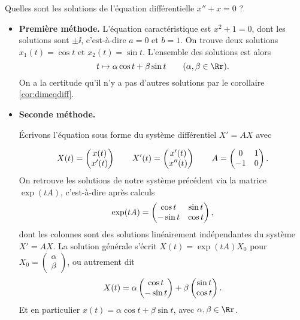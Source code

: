 \documentclass[12pt, class=report,crop=false]{standalone}
\begin{document}
\begin{exemple}
Quelles sont les solutions de l'équation différentielle $x''+x=0$ ?


\begin{itemize}
  \item \textbf{Première méthode.}
  L'équation caractéristique est $x^2+1=0$, dont les solutions sont $\pm\ii$, c'est-à-dire 
  $a=0$ et $b=1$. On trouve deux solutions $x_1(t) = \cos t$ et $x_2(t)=\sin t$. L'ensemble des solutions
  est alors   
  $$t \mapsto \alpha \cos t + \beta \sin t \qquad (\alpha,\beta \in \Rr).$$
  On a la certitude qu'il n'y a pas d'autres solutions par le corollaire \ref{cor:dimeqdiff}.
  
  
  \item \textbf{Seconde méthode.} 

  \'Ecrivons l'équation sous forme du système différentiel $X' = AX$ avec
  
$$
X(t) = \begin{pmatrix}x(t)\cr x'(t)\end{pmatrix}\qquad 
X'(t) = \begin{pmatrix}x'(t)\cr x''(t)\end{pmatrix}\qquad
A = \begin{pmatrix}0&1\cr-1&0\end{pmatrix}.
$$
On retrouve les solutions de notre système précédent via la matrice $\exp (tA)$, c'est-à-dire après calculs 
$$\exp (tA) = \begin{pmatrix}\cos t&\sin t\cr-\sin t&\cos t \end{pmatrix},$$
dont les colonnes sont des solutions linéairement indépendantes du système $X'=AX$.
La solution générale s'écrit $X(t) = \exp (tA) X_0$ pour 
$X_0 = \left( \begin{smallmatrix} \alpha \\ \beta \end{smallmatrix} \right)$, ou autrement dit
$$X(t)= \alpha \begin{pmatrix}\cos t\cr -\sin t\end{pmatrix} +  \beta \begin{pmatrix}\sin t\cr \cos t\end{pmatrix}.$$
Et en particulier $x(t) = \alpha \cos t + \beta \sin t$, avec $\alpha, \beta \in \Rr$. 
\end{itemize}
\end{exemple}



\end{document}
